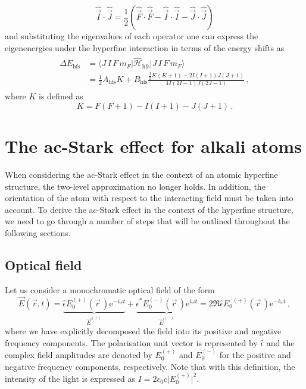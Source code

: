 \documentclass[../Thesis-IJspeert.tex]{subfiles}
\begin{document}
\begin{equation}
\hat{\vec{I}} \cdot \hat{\vec{J}} = \frac{1}{2}\left(\hat{\vec{F}} \cdot \hat{\vec{F}} - \hat{\vec{I}} \cdot \hat{\vec{I}} - \hat{\vec{J}} \cdot \hat{\vec{J}}\right)
\end{equation}
and substituting the eigenvalues of each operator one can express the eigenenergies under the hyperfine interaction in terms of the energy shifts as
\begin{align}
\begin{split}
\Delta E_{\text{hfs}}&= \langle J\, I\, F\, m_F \vert \hat{\mathcal{H}}_{\text{hfs}} \vert J\, I\, F\, m_F \rangle\\ &= \frac{1}{2} A_{\text{hfs}} K+B_{\text{hfs}} \frac{\frac{3}{2} K(K+1)-2 I(I+1) J(J+1)}{4 I(2 I-1) J(2 J-1)} \,,
\end{split}
\end{align}
where $K$ is defined as
\begin{equation}
K = F(F+1)- I(I+1) - J(J+1) \,.
\end{equation}
\section{The ac-Stark effect for alkali atoms}
\label{acstark}
When considering the ac-Stark effect in the context of an atomic hyperfine structure, the two-level approximation no longer holds. In addition, the orientation of the atom with respect to the interacting field must be taken into account. To derive the ac-Stark effect in the context of the hyperfine structure, we need to go through a number of steps that will be outlined throughout the following sections.
\subsection{Optical field}
Let us consider a monochromatic optical field of the form
\begin{equation}
\label{Efield}
\vec{E}(\vec{r},t) = \underbrace{\hat{\epsilon}E_0^{(+)}(\vec{r}\,) \mathrm{e}^{-i\omega t}}_{\vec{E}^{(+)}} +  \underbrace{\hat{\epsilon}^*E_0^{(-)}(\vec{r}\,) \mathrm{e}^{i\omega t}}_{\vec{E}^{(-)}} =  2\Re {\hat{\epsilon}{E_0}^{(+)}(\vec{r}\,) \mathrm{e}^{-i\omega t} } \,,
\end{equation}
where we have explicitly decomposed the field into its positive and negative frequency components. The polarisation unit vector is represented by $\hat{\epsilon}$ and the complex field amplitudes are denoted by $E_0^{(+)}$ and $E_0^{(-)}$ for the positive and negative frequency components, respectively. Note that with this definition, the intensity of the light is expressed as $I=2\epsilon_0 c \vert E_0^{(+)}\vert ^2$.
\end{document}
